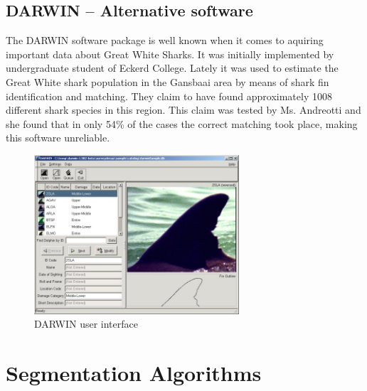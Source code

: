 \documentclass[a4paper,10pt]{article}
\begin{document}
\newpage
\subsection{DARWIN -- Alternative software}
The DARWIN\cite{Darwin} software package is well known when it comes to
aquiring important data about Great White Sharks.  It was initially implemented
by undergraduate student of
Eckerd College.
Lately it was used to estimate the Great White shark population in the
Gansbaai area by means of shark fin identification and matching.  They claim to
have found approximately
1008 different shark species in this region.  This
claim was tested by Ms. Andreotti and she found that in only
54\% of the cases the correct matching took place, making this software
unreliable.

\begin{figure}[H]
 \centering
 \includegraphics[width=3in]{Darwin.jpg}
 \caption{DARWIN user interface}
\end{figure}

\newpage
\section{Segmentation Algorithms}
\end{document}

